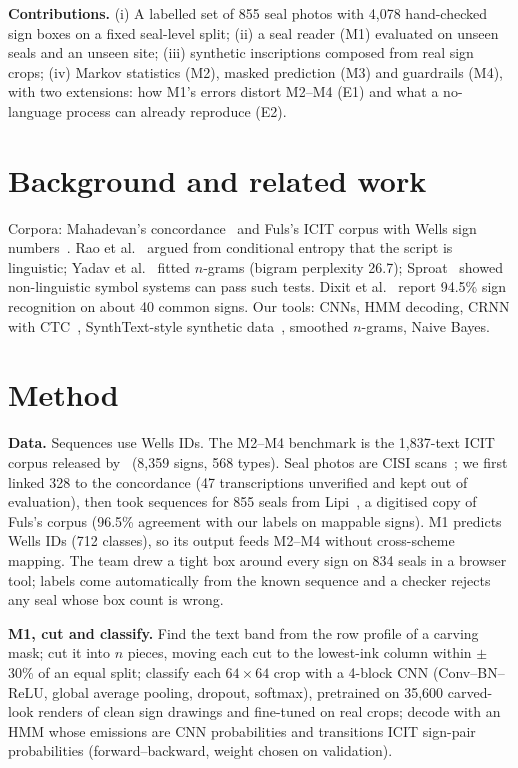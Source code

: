 \documentclass[11pt,a4paper,twocolumn]{article}
\begin{document}
\textbf{Contributions.} (i) A labelled set of 855 seal photos with 4,078 hand-checked sign boxes on a fixed seal-level split; (ii) a seal reader (M1) evaluated on unseen seals and an unseen site; (iii) synthetic inscriptions composed from real sign crops; (iv) Markov statistics (M2), masked prediction (M3) and guardrails (M4), with two extensions: how M1's errors distort M2--M4 (E1) and what a no-language process can already reproduce (E2).

\section{Background and related work}
Corpora: Mahadevan's concordance~\cite{mahadevan1977} and Fuls's ICIT corpus with Wells sign numbers~\cite{fuls2022}. Rao et al.~\cite{rao2009} argued from conditional entropy that the script is linguistic; Yadav et al.~\cite{yadav2010plos} fitted $n$-grams (bigram perplexity 26.7); Sproat~\cite{sproat2014} showed non-linguistic symbol systems can pass such tests. Dixit et al.~\cite{dixit2025} report 94.5\% sign recognition on about 40 common signs. Our tools: CNNs, HMM decoding, CRNN with CTC~\cite{graves2006ctc}, SynthText-style synthetic data~\cite{gupta2016synthtext}, smoothed $n$-grams, Naive Bayes.

\section{Method}
\textbf{Data.} Sequences use Wells IDs. The M2--M4 benchmark is the 1,837-text ICIT corpus released by~\cite{ashraf2018} (8,359 signs, 568 types). Seal photos are CISI scans~\cite{cisi1}; we first linked 328 to the concordance (47 transcriptions unverified and kept out of evaluation), then took sequences for 855 seals from Lipi~\cite{lipi}, a digitised copy of Fuls's corpus (96.5\% agreement with our labels on mappable signs). M1 predicts Wells IDs (712 classes), so its output feeds M2--M4 without cross-scheme mapping. The team drew a tight box around every sign on 834 seals in a browser tool; labels come automatically from the known sequence and a checker rejects any seal whose box count is wrong.

\textbf{M1, cut and classify.} Find the text band from the row profile of a carving mask; cut it into $n$ pieces, moving each cut to the lowest-ink column within $\pm$30\% of an equal split; classify each $64{\times}64$ crop with a 4-block CNN (Conv--BN--ReLU, global average pooling, dropout, softmax), pretrained on 35,600 carved-look renders of clean sign drawings and fine-tuned on real crops; decode with an HMM whose emissions are CNN probabilities and transitions ICIT sign-pair probabilities (forward--backward, weight chosen on validation).
\end{document}
